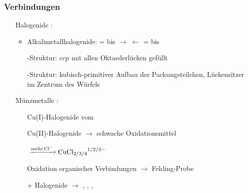 \documentclass{article}
\begin{document}
\subsubsection{Verbindungen}
\begin{itemize}
    \item[Halogenide]:
    \begin{itemize}
        \item Alkalimetallhalogenide:  =  bis  $\rightarrow$  $\leftarrow$  =  bis 
        \item[] -Struktur: ccp mit allen Oktaederlücken gefüllt
        \item[] -Struktur: kubisch-primitiver Aufbau der Packungsteilchen, Lückensitzer im Zentrum des Würfels 
    \end{itemize}
    \item[Münzmetalle]:
    \begin{itemize}
        \item[] Cu(I)-Halogenide vom 
        \item[] Cu(II)-Halogenide $\rightarrow$ schwache Oxidationsmittel
        \item[]  $\ce{->[\mathrm{mehr} \ce{Cl^-}] CuCl_{2/3/4}^{1/2/3 -}}$
        \item[] 
        \item[] 
        \item[] 
        \item[] Oxidation organischer Verbindungen $\rightarrow$ Fehling-Probe
        \item[]  + Halogenide $\rightarrow$ , , ,  
    \end{itemize}
\end{itemize}
\end{document}
